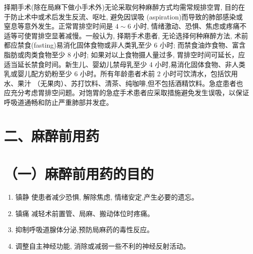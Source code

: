 \documentclass[10pt]{article}
\begin{document}
择期手术(除在局麻下做小手术外)无论采取何种麻醉方式均需常规排空胃, 目的在于防止术中或术后发生反流、呕吐, 避免因误吸 (aspiration)而导致的肺部感染或窒息等意外发生。正常胃排空时间是 $4 \sim 6$ 小时, 情绪激动、恐惧、焦虑或疼痛不适等可使胃排空显著减慢。一般认为, 择期手术患者, 无论选择何种麻醉方法, 术前都应禁食(fasting)易消化固体食物或非人类乳至少 6 小时; 而禁食油炸食物、富含脂肪或肉类食物至少 8 小时; 如果对以上食物摄人量过多, 胃排空时间可延长，应适当延长禁食时间。新生儿、婴幼儿禁母乳至少 4 小时,易消化固体食物、非人类乳或婴儿配方奶粉至少 6 小时。所有年龄患者术前 2 小时可饮清水，包括饮用水、果汁 （无果肉）、苏打饮料、清茶、纯咖啡,但不包括酒精饮料。急症患者也应充分考虑胃排空问题。对饱胃的急症手术患者应采取措施避免发生误吸，以保证呼吸道通畅和防止严重肺部并发症。

\section*{二、麻醉前用药}
\section*{（一）麻醉前用药的目的}
\begin{enumerate}
  \item 镇静 使患者减少恐惧, 解除焦虑, 情绪安定,产生必要的遗忘。

  \item 镇痛 减轻术前置管、局麻、搬动体位时疼痛。

  \item 抑制呼吸道腺体分泌,预防局麻药的毒性反应。

  \item 调整自主神经功能, 消除或减弱一些不利的神经反射活动。

\end{enumerate}
\end{document}

